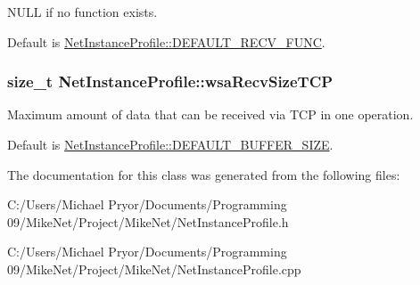NULL if no function exists.\par
\par


Default is \hyperlink{class_net_instance_profile_a51f05ca66c76fdc588d34455d5185f6b}{NetInstanceProfile::DEFAULT\_\-RECV\_\-FUNC}. \hypertarget{class_net_instance_profile_ad83ca6291444ecb7e1138f336952afc7}{
\subsubsection[{wsaRecvSizeTCP}]{\setlength{\rightskip}{0pt plus 5cm}size\_\-t {\bf NetInstanceProfile::wsaRecvSizeTCP}}}
\label{class_net_instance_profile_ad83ca6291444ecb7e1138f336952afc7}


Maximum amount of data that can be received via TCP in one operation. 

Default is \hyperlink{class_net_instance_profile_a285d88534b9936cc603e778aa70d8ec3}{NetInstanceProfile::DEFAULT\_\-BUFFER\_\-SIZE}. 

The documentation for this class was generated from the following files:\begin{DoxyCompactItemize}
\item 
C:/Users/Michael Pryor/Documents/Programming 09/MikeNet/Project/MikeNet/NetInstanceProfile.h\item 
C:/Users/Michael Pryor/Documents/Programming 09/MikeNet/Project/MikeNet/NetInstanceProfile.cpp\end{DoxyCompactItemize}
